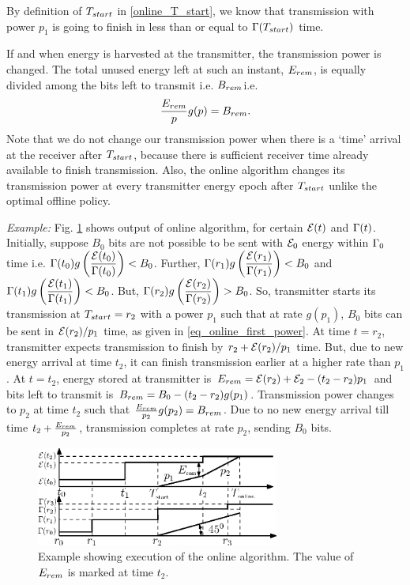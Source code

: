 By definition of $T_{\mbox{\scriptsize{start}}}$ in \eqref{online_T_start}, we know that transmission with power $p_1$ is going to finish in less than or equal to  $\TRx(T_{\mbox{\scriptsize{start}}})$ time.

If and when energy is harvested at the transmitter, the transmission power is changed. The total unused energy left at such an instant, $E_{\mbox{\scriptsize{rem}}}$, is equally divided among the bits left to transmit i.e. $B_{\mbox{\scriptsize{rem}}}$i.e. 
\begin{equation}
\frac{E_{\mbox{\scriptsize{rem}}}}{p} g(p)= B_{\mbox{\scriptsize{rem}}}.\end{equation}
Note that we do not change our transmission power when there is a `time' arrival at the receiver after $T_{\mbox{\scriptsize{start}}}$, because there is sufficient receiver time already available to finish transmission. Also, the online algorithm changes its transmission power at every transmitter energy epoch after $T_{\mbox{\scriptsize{start}}}$ unlike the optimal offline policy. 

\textit{Example:} Fig. \ref{figure_online_example} shows output of online algorithm, for certain $\mathcal{E}(t)$ and $\Gamma(t)$. Initially, suppose $B_0$ bits are not possible to be sent with $\mathcal{E}_0$ energy  within $\Gamma_0$ time i.e. $\Gamma(t_0)g\left( \dfrac{\mathcal{E}(t_0)}{\Gamma(t_0)}\right)<B_0$. Further, $\Gamma(r_1)g\left( \dfrac{\mathcal{E}(r_1)}{\Gamma(r_1)}\right)<B_0$ and $\Gamma(t_1)g\left( \dfrac{\mathcal{E}(t_1)}{\Gamma(t_1)}\right)<B_0$. But, $\Gamma(r_2)g\left( \dfrac{\mathcal{E}(r_2)}{\Gamma(r_2)}\right)>B_0$. So, transmitter starts its transmission at $T_{\mbox{\scriptsize{start}}}=r_2$ with a power $p_1$ such that at rate $g(p_1)$, $B_0$ bits can be sent in $\mathcal{E}(r_2)/p_1$ time, as given in \eqref{eq_online_first_power}. At time $t=r_2$, transmitter expects transmission to finish by $r_2+\mathcal{E}(r_2)/p_1$ time. But, due to new energy arrival at time $t_2$, it can finish transmission earlier at a higher rate than $p_1$. At $t=t_2$, energy stored at transmitter is $E_{\mbox{\scriptsize{rem}}}=\ETx(r_2)+\ETx_2-(t_2-r_2)p_1$ and bits left to transmit is $B_{\mbox{\scriptsize{rem}}}=B_0-(t_2-r_2)g(p_1)$. Transmission power changes to $p_2$ at time $t_2$ such that $\frac{E_{\mbox{\scriptsize{rem}}}}{p_2}g(p_2)=B_{\mbox{\scriptsize{rem}}}$. Due to no new energy arrival till time $t_2+\frac{E_{\mbox{\scriptsize{rem}}}}{p_2}$, transmission completes at rate $p_2$, sending $B_0$ bits. 

\begin{figure}
\centering
  \centerline{\includegraphics[width=8cm]{online.eps}}
\caption{Example showing execution of the online algorithm. The value of $E_{\mbox{\scriptsize{rem}}}$ is marked at time $t_2$.}\label{figure_online_example}
\end{figure}



